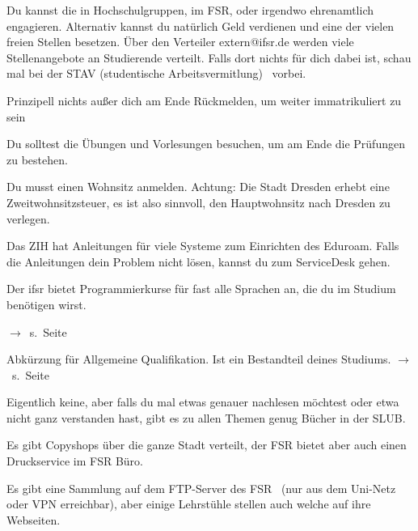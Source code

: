 Du kannst die in Hochschulgruppen, im FSR, oder irgendwo ehrenamtlich engagieren. Alternativ kannst du natürlich Geld verdienen und eine der vielen freien Stellen besetzen. Über den Verteiler extern@ifsr.de werden viele Stellenangebote an Studierende verteilt. Falls dort nichts für dich dabei ist, schau mal bei der STAV (studentische Arbeitsvermitlung)~ vorbei.

Prinzipell nichts außer dich am Ende Rückmelden, um weiter immatrikuliert zu sein

Du solltest die Übungen und Vorlesungen besuchen, um am Ende die Prüfungen zu bestehen.

Du musst einen Wohnsitz anmelden. Achtung: Die Stadt Dresden erhebt eine Zweitwohnsitzsteuer, es ist also sinnvoll, den Hauptwohnsitz nach Dresden zu verlegen.

Das ZIH hat Anleitungen für viele Systeme zum Einrichten des Eduroam. Falls die Anleitungen dein Problem nicht lösen, kannst du zum ServiceDesk gehen.

Der ifsr bietet Programmierkurse für fast alle Sprachen an, die du im Studium benötigen wirst. 

\label{minisec:faq}
$\rightarrow$~s.~Seite~\pageref{minisec:faq}

Abkürzung für Allgemeine Qualifikation. Ist ein Bestandteil deines Studiums. $\rightarrow$~s.~Seite~\pageref{lec:aqua}

Eigentlich keine, aber falls du mal etwas genauer nachlesen möchtest oder etwa nicht ganz verstanden hast, gibt es zu allen Themen genug Bücher in der SLUB.

Es gibt Copyshops über die ganze Stadt verteilt, der FSR bietet aber auch einen Druckservice im FSR Büro.

Es gibt eine Sammlung auf dem FTP-Server des FSR~ (nur aus dem Uni-Netz oder VPN erreichbar), aber einige Lehrstühle stellen auch welche auf ihre Webseiten.
